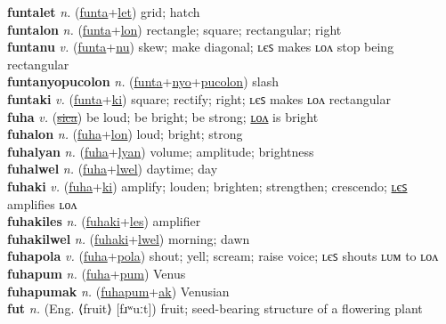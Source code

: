\textbf{funtalet} \textit{n.} (\hyperref[funta]{funta}+\hyperref[let]{let})
grid; hatch \label{funtalet} \\
\textbf{funtalon} \textit{n.} (\hyperref[funta]{funta}+\hyperref[lon]{lon})
rectangle; square; rectangular; right \label{funtalon} \\
\textbf{funtanu} \textit{v.} (\hyperref[funta]{funta}+\hyperref[nu]{nu})
skew; make diagonal; ʟєꜱ makes ʟᴏᴧ stop being rectangular \label{funtanu} \\
\textbf{funtanyopucolon} \textit{n.} (\hyperref[funta]{funta}+\hyperref[nyo]{nyo}+\hyperref[pucolon]{pucolon})
slash \label{funtanyopucolon} \\
\textbf{funtaki} \textit{v.} (\hyperref[funta]{funta}+\hyperref[ki]{ki})
square; rectify; right; ʟєꜱ makes ʟᴏᴧ rectangular \label{funtaki} \\
\textbf{fuha} \textit{v.} (\hyperref[sica]{\sout{sica}})
be loud; be bright; be strong; \hyperref[fuhalon]{ʟᴏᴧ} is bright \label{fuha} \\
\textbf{fuhalon} \textit{n.} (\hyperref[fuha]{fuha}+\hyperref[lon]{lon})
loud; bright; strong \label{fuhalon} \\
\textbf{fuhalyan} \textit{n.} (\hyperref[fuha]{fuha}+\hyperref[lyan]{lyan})
volume; amplitude; brightness \label{fuhalyan} \\
\textbf{fuhalwel} \textit{n.} (\hyperref[fuha]{fuha}+\hyperref[lwel]{lwel})
daytime; day \label{fuhalwel} \\
\textbf{fuhaki} \textit{v.} (\hyperref[fuha]{fuha}+\hyperref[ki]{ki})
amplify; louden; brighten; strengthen; crescendo; \hyperref[fuhakiles]{ʟєꜱ} amplifies ʟᴏᴧ \label{fuhaki} \\
\textbf{fuhakiles} \textit{n.} (\hyperref[fuhaki]{fuhaki}+\hyperref[les]{les})
amplifier \label{fuhakiles} \\
\textbf{fuhakilwel} \textit{n.} (\hyperref[fuhaki]{fuhaki}+\hyperref[lwel]{lwel})
morning; dawn \label{fuhakilwel} \\
\textbf{fuhapola} \textit{v.} (\hyperref[fuha]{fuha}+\hyperref[pola]{pola})
shout; yell; scream; raise voice; ʟєꜱ shouts ʟᴜᴍ to ʟᴏᴧ \label{fuhapola} \\
\textbf{fuhapum} \textit{n.} (\hyperref[fuha]{fuha}+\hyperref[pum]{pum})
Venus \label{fuhapum} \\
\textbf{fuhapumak} \textit{n.} (\hyperref[fuhapum]{fuhapum}+\hyperref[ak]{ak})
Venusian \label{fuhapumak} \\
\textbf{fut} \textit{n.} (Eng. ⟨fruit⟩ [fɹʷuːt])
fruit; seed-bearing structure of a flowering plant \label{fut} \\
